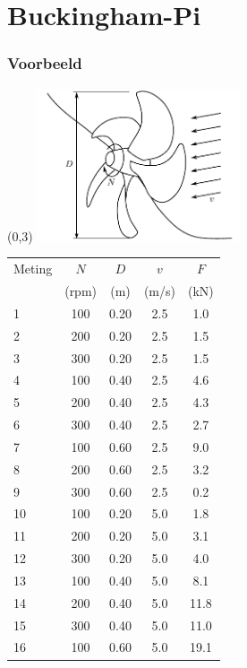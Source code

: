 \documentclass[t]{beamer}
\begin{document}
	\section{Buckingham-Pi}
	\begin{frame}
		\frametitle{Voorbeeld}
		\begin{textblock}{6}(0,3)
            \includegraphics[width=6cm]{fig/gelijkvormigheid/Dimensieanalyse_voorbeeld_propellor}
        \end{textblock}
        \pause
		\hfill
		\tiny
		\begin{tabular}{lcccc}
			\hline
			Meting  & $N$   & $D$ & $v$   & $F$\\
			        & (rpm) & (m) & (m/s) & (kN)\\
			\hline                          
	        1 & 100 & 0.20 & 2.5 & 1.0 \\       
	        2 & 200 & 0.20 & 2.5 & 1.5 \\       
	        3 & 300 & 0.20 & 2.5 & 1.5 \\       
	        4 & 100 & 0.40 & 2.5 & 4.6 \\       
	        5 & 200 & 0.40 & 2.5 & 4.3 \\       
	        6 & 300 & 0.40 & 2.5 & 2.7 \\       
	        7 & 100 & 0.60 & 2.5 & 9.0 \\       
	        8 & 200 & 0.60 & 2.5 & 3.2 \\       
	        9 & 300 & 0.60 & 2.5 & 0.2 \\       
	        10 & 100 & 0.20 & 5.0 & 1.8 \\      
	        11 & 200 & 0.20 & 5.0 & 3.1 \\      
	        12 & 300 & 0.20 & 5.0 & 4.0 \\      
	        13 & 100 & 0.40 & 5.0 & 8.1 \\      
	        14 & 200 & 0.40 & 5.0 & 11.8 \\     
	        15 & 300 & 0.40 & 5.0 & 11.0 \\     
	        16 & 100 & 0.60 & 5.0 & 19.1 \\     

\end{tabular}
\end{frame}
\end{document}
